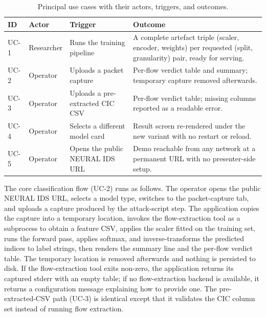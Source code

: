 \begin{table}[htbp]
\begin{center}
\begin{tabular}{|p{34pt}|p{92pt}|p{95pt}|p{125pt}|}
\hline
\textbf{ID} & \textbf{Actor} & \textbf{Trigger} & \textbf{Outcome} \\
\hline
\hline UC-1 & Researcher & Runs the training pipeline & A complete artefact triple (scaler, encoder, weights) per requested (split, granularity) pair, ready for serving. \\
\hline UC-2 & Operator & Uploads a packet capture & Per-flow verdict table and summary; temporary capture removed afterwards. \\
\hline UC-3 & Operator & Uploads a pre-extracted CIC CSV & Per-flow verdict table; missing columns reported as a readable error. \\
\hline UC-4 & Operator & Selects a different model card & Result screen re-rendered under the new variant with no restart or reload. \\
\hline UC-5 & Operator & Opens the public NEURAL IDS URL & Demo reachable from any network at a permanent URL with no presenter-side setup. \\
\hline
\end{tabular}
\end{center}
\caption{Principal use cases with their actors, triggers, and outcomes.}
\label{tab:use_cases}
\end{table}

\par The core classification flow (UC-2) runs as follows. The operator opens the public NEURAL IDS URL, selects a model type, switches to the packet-capture tab, and uploads a capture produced by the attack-script step. The application copies the capture into a temporary location, invokes the flow-extraction tool as a subprocess to obtain a feature CSV, applies the scaler fitted on the training set, runs the forward pass, applies softmax, and inverse-transforms the predicted indices to label strings, then renders the summary line and the per-flow verdict table. The temporary location is removed afterwards and nothing is persisted to disk. If the flow-extraction tool exits non-zero, the application returns its captured stderr with an empty table; if no flow-extraction backend is available, it returns a configuration message explaining how to provide one. The pre-extracted-CSV path (UC-3) is identical except that it validates the CIC column set instead of running flow extraction.

